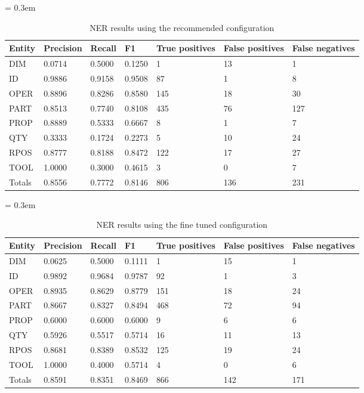 \begin{table}[ht]
	\caption{NER results using the recommended configuration}
	\tabulinesep = 0.3em
	\setlength{\tabcolsep}{0.2em}
	\centering
	\begin{tabu} { X[c,m] X[r,m] X[r,m] X[r,m] X[r,m] X[r,m] X[r,m] }
		\rowfont{\bfseries\itshape} Entity & Precision & Recall & F1 & True positives & False positives & False negatives \\
		\hline
		DIM & 0.0714 & 0.5000 & 0.1250 & 1 & 13 & 1 \\
		ID & 0.9886 & 0.9158 & 0.9508 & 87 & 1 & 8 \\
		OPER & 0.8896 & 0.8286 & 0.8580 & 145 & 18 & 30 \\
		PART & 0.8513 & 0.7740 & 0.8108 & 435 & 76 & 127 \\
		PROP & 0.8889 & 0.5333 & 0.6667 & 8 & 1 & 7 \\
		QTY & 0.3333 & 0.1724 & 0.2273 & 5 & 10 & 24 \\
		RPOS & 0.8777 & 0.8188 & 0.8472 & 122 & 17 & 27 \\
		TOOL & 1.0000 & 0.3000 & 0.4615 & 3 & 0 & 7 \\
		\rowfont{\bfseries} Totals & 0.8556 & 0.7772 & 0.8146 & 806 & 136 & 231 \\
	\end{tabu}
	\label{tab:results_recommended-configuration}
\end{table}


\begin{table}[ht]
	\caption{NER results using the fine tuned configuration}
	\tabulinesep = 0.3em
	\setlength{\tabcolsep}{0.2em}
	\centering
	\begin{tabu} { X[c,m] X[r,m] X[r,m] X[r,m] X[r,m] X[r,m] X[r,m] }
		\rowfont{\bfseries\itshape} Entity & Precision & Recall & F1 & True positives & False positives & False negatives \\
		\hline
		DIM & 0.0625 & 0.5000 & 0.1111 & 1 & 15 & 1 \\
		ID & 0.9892 & 0.9684 & 0.9787 & 92 & 1 & 3 \\
		OPER & 0.8935 & 0.8629 & 0.8779 & 151 & 18 & 24 \\
		PART & 0.8667 & 0.8327 & 0.8494 & 468 & 72 & 94 \\
		PROP & 0.6000 & 0.6000 & 0.6000 & 9 & 6 & 6 \\
		QTY & 0.5926 & 0.5517 & 0.5714 & 16 & 11 & 13 \\
		RPOS & 0.8681 & 0.8389 & 0.8532 & 125 & 19 & 24 \\
		TOOL & 1.0000 & 0.4000 & 0.5714 & 4 & 0 & 6 \\
		\rowfont{\bfseries} Totals & 0.8591 & 0.8351 & 0.8469 & 866 & 142 & 171 \\
	\end{tabu}
	\label{tab:results_optimal-configuration}
\end{table}
